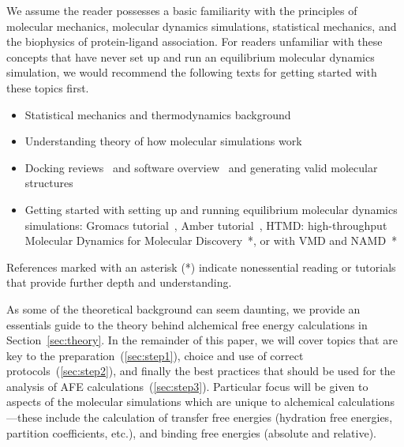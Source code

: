 \documentclass[9pt,bestpractices]{livecoms}
\begin{document}
We assume the reader possesses a basic familiarity with the principles of molecular mechanics, molecular dynamics simulations, statistical mechanics, and the biophysics of protein-ligand association.
For readers unfamiliar with these concepts that have never set up and run an equilibrium molecular dynamics simulation, we would recommend the following texts for getting started with these topics first. 
\begin{itemize}
    \item Statistical mechanics and thermodynamics background~\cite{hill1956statistical, alavi2011statistical}
    \item Understanding theory of how molecular simulations work~\cite{frenkel2002understanding}
    \item Docking reviews~\cite{yuriev2013latest, meng2011molecular} and software overview~\cite{pagadala2017software} and generating valid molecular structures ~\cite{loeffler2015fesetup}
    \item Getting started with setting up and running equilibrium molecular dynamics simulations: Gromacs tutorial~\cite{lemkul2018From}, Amber tutorial~\cite{amber}, HTMD: high-throughput Molecular Dynamics for Molecular Discovery~\cite{doerr2016htmd}*, or with VMD and NAMD~\cite{ribeiro2016easy}*
\end{itemize}
References marked with an asterisk (*) indicate nonessential reading or tutorials that provide further depth and understanding.

As some of the theoretical background can seem daunting, we provide an essentials guide to the theory behind alchemical free energy calculations in Section~\ref{sec:theory}.
In the remainder of this paper, we will cover topics that are key to the preparation~(\ref{sec:step1}), choice and use of correct protocols~(\ref{sec:step2}), and finally the best practices that should be used for the analysis of AFE calculations~(\ref{sec:step3}). 
Particular focus will be given to aspects of the molecular simulations which are unique to alchemical calculations---these include the calculation of transfer free energies (hydration free energies, partition coefficients, etc.), and binding free energies (absolute and relative).
\end{document}

